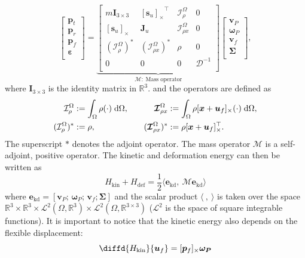 \documentclass{svjour3}                     %
\newcommand{\crmat}[1]{\ensuremath{[#1]_{\times}}}
\begin{document}
\begin{equation}
\label{eq:mass_op}
\begin{bmatrix}
\bm{p}_t \\ \bm{p}_r \\ \bm{p}_f \\ \bm\varepsilon \\
\end{bmatrix} = 
\underbrace{\begin{bmatrix}
	m \bm{I}_{3\times 3} & \crmat{\bm{s}_u}^\top & \mathcal{I}_\rho^{\Omega} & 0 \\
	\crmat{\bm{s}_u} & \bm{J}_u & \bm{\mathcal{I}}_{\rho x}^{\Omega} & 0  \\
	(\mathcal{I}_\rho^{\Omega})^* & (\bm{\mathcal{I}}_{\rho x}^{\Omega})^* & \rho & 0  \\
	0 & 0 & 0 & \bm{\mathcal{D}}^{-1} \\
	\end{bmatrix}}_{\bm{\mathcal{M}}: \; \text{Mass operator}}
\begin{bmatrix}
\bm{v}_P \\ \bm{\omega}_P  \\ \bm{v}_f  \\ \bm\Sigma \\
\end{bmatrix},
\end{equation}
where $\bm{I}_{3\times 3}$ is the identity matrix in $\mathbb{R}^3$. and the operators are defined as
\begin{equation*}
\begin{aligned}
\mathcal{I}_\rho^\Omega &:=\int_{\Omega} \rho (\cdot) \d{\Omega}, \\
(\mathcal{I}_\rho^{\Omega})^* &:= \rho, \\
\end{aligned} \qquad
\begin{aligned} 
\bm{\mathcal{I}}_{\rho x}^{\Omega} &:= \int_\Omega \rho \crmat{\bm{x}+\bm{u}_f} (\cdot) \d{\Omega}, \\
(\bm{\mathcal{I}}_{\rho x}^{\Omega})^* &:= \rho \crmat{\bm{x}+\bm{u}_f}^\top. \\
\end{aligned}
\end{equation*}
The superscript $*$ denotes the adjoint operator. The mass operator $\bm{\mathcal{M}}$ is a self-adjoint, positive operator. The kinetic and deformation energy can then be written as
\begin{equation}
H_{\text{kin}} + H_{\text{def}} = \frac{1}{2} \langle \bm{e}_{\text{kd}}, \ \bm{\mathcal{M}} \bm{e}_{\text{kd}} \rangle
\end{equation}
where $\bm{e}_{\text{kd}} = [\bm{v}_P; \, \bm{\omega}_P; \, \bm{v}_f; \bm{\Sigma}]$ and the scalar product $\langle \ , \ \rangle$ is taken over the space $\mathbb{R}^3 \times \mathbb{R}^3 \times \mathscr{L}^2(\Omega, \mathbb{R}^3) \times \mathscr{L}^2(\Omega, \mathbb{R}^{3\times 3})$ ($\mathscr{L}^2$ is the space of square integrable functions). It is important to notice that the kinetic energy also depends on the flexible displacement:
\[
\diffd{H_{\text{kin}}}{\bm{u}_f} = \crmat{\bm{p}_f} \bm{\omega_{P}}
\]
\end{document}
